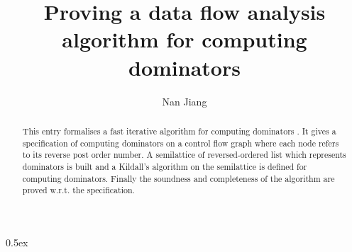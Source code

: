 \documentclass[11pt,a4paper]{article}
\begin{document}
\title{Proving a data flow analysis algorithm for computing dominators}
\author{Nan Jiang}
\maketitle

\begin{abstract}
This entry formalises a fast iterative algorithm for computing dominators \cite{Dominance_Algorithm}.
It gives a specification of computing dominators on a control flow graph where each node refers to its reverse post order number. A semilattice of reversed-ordered list which represents dominators is built and a Kildall's algorithm on the semilattice is defined for computing dominators. Finally the soundness and completeness of the algorithm are proved w.r.t. the specification. 
\end{abstract}

\tableofcontents

\parindent 0pt\parskip 0.5ex





\end{document}
